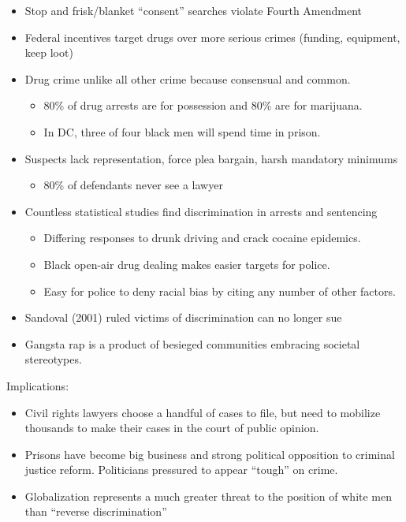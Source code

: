 \documentclass[
]{article}
\providecommand{\tightlist}{%
  \setlength{\itemsep}{0pt}\setlength{\parskip}{0pt}}
\begin{document}
\begin{itemize}
\item
  Stop and frisk/blanket ``consent'' searches violate Fourth Amendment
\item
  Federal incentives target drugs over more serious crimes (funding,
  equipment, keep loot)
\item
  Drug crime unlike all other crime because consensual and common.

  \begin{itemize}
  \item
    80\% of drug arrests are for possession and 80\% are for marijuana.
  \item
    In DC, three of four black men will spend time in prison.
  \end{itemize}
\item
  Suspects lack representation, force plea bargain, harsh mandatory
  minimums

  \begin{itemize}
  \tightlist
  \item
    80\% of defendants never see a lawyer
  \end{itemize}
\item
  Countless statistical studies find discrimination in arrests and
  sentencing

  \begin{itemize}
  \item
    Differing responses to drunk driving and crack cocaine epidemics.
  \item
    Black open-air drug dealing makes easier targets for police.
  \item
    Easy for police to deny racial bias by citing any number of other
    factors.
  \end{itemize}
\item
  Sandoval (2001) ruled victims of discrimination can no longer sue
\item
  Gangsta rap is a product of besieged communities embracing societal
  stereotypes.
\end{itemize}

Implications:

\begin{itemize}
\item
  Civil rights lawyers choose a handful of cases to file, but need to
  mobilize thousands to make their cases in the court of public opinion.
\item
  Prisons have become big business and strong political opposition to
  criminal justice reform. Politicians pressured to appear ``tough'' on
  crime.
\item
  Globalization represents a much greater threat to the position of
  white men than ``reverse discrimination''
\end{itemize}
\end{document}
